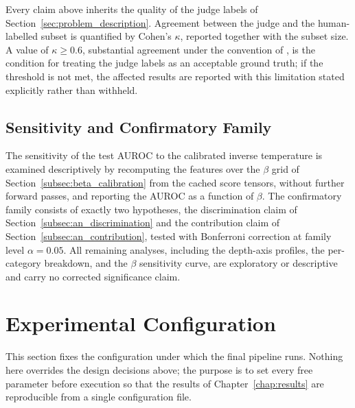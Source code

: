 Every claim above inherits the quality of the judge labels of
Section~\ref{sec:problem_description}. Agreement between the judge and the
human-labelled subset is quantified by Cohen's $\kappa$, reported together
with the subset size. A value of $\kappa \ge 0.6$, substantial agreement
under the convention of \citet{landis1977measurement}, is the condition for
treating the judge labels as an acceptable ground truth; if the threshold
is not met, the affected results are reported with this limitation stated
explicitly rather than withheld.

\subsection{Sensitivity and Confirmatory Family}
\label{subsec:an_sensitivity}

The sensitivity of the test AUROC to the calibrated inverse temperature is
examined descriptively by recomputing the features over the $\beta$ grid of
Section~\ref{subsec:beta_calibration} from the cached score tensors,
without further forward passes, and reporting the AUROC as a function of
$\beta$. The confirmatory family consists of exactly two hypotheses, the
discrimination claim of Section~\ref{subsec:an_discrimination} and the
contribution claim of Section~\ref{subsec:an_contribution}, tested with
Bonferroni correction at family level $\alpha = 0.05$. All remaining
analyses, including the depth-axis profiles, the per-category breakdown,
and the $\beta$ sensitivity curve, are exploratory or descriptive and carry
no corrected significance claim.

\section{Experimental Configuration}
\label{sec:experimental_config}

This section fixes the configuration under which the final pipeline runs.
Nothing here overrides the design decisions above; the purpose is to set
every free parameter before execution so that the results of
Chapter~\ref{chap:results} are reproducible from a single configuration
file.

